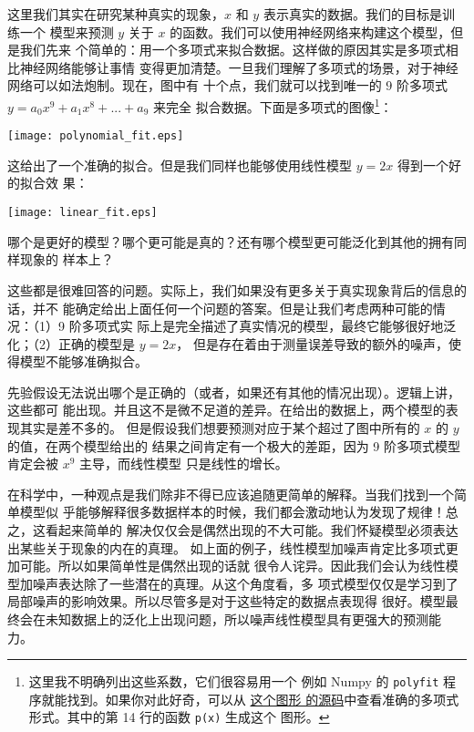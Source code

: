 这里我们其实在研究某种真实的现象，$x$ 和 $y$ 表示真实的数据。我们的目标是训练一个
模型来预测 $y$ 关于 $x$ 的函数。我们可以使用神经网络来构建这个模型，但是我们先来
个简单的：用一个多项式来拟合数据。这样做的原因其实是多项式相比神经网络能够让事情
变得更加清楚。一旦我们理解了多项式的场景，对于神经网络可以如法炮制。现在，图中有
十个点，我们就可以找到唯一的 $9$ 阶多项式 $y=a_0x^9 + a_1x^8 + ... + a_9$ 来完全
拟合数据。下面是多项式的图像\footnote{这里我不明确列出这些系数，它们很容易用一个
  例如 Numpy 的 \lstinline!polyfit! 程序就能找到。如果你对此好奇，可以从%
  \href{http://neuralnetworksanddeeplearning.com/js/polynomial_model.js}{这个图形
    的源码}中查看准确的多项式形式。其中的第 14 行的函数 \lstinline!p(x)! 生成这个
  图形。}：
\begin{center}
  \texttt{[image: polynomial\_fit.eps]}
\end{center}

这给出了一个准确的拟合。但是我们同样也能够使用线性模型 $y=2x$ 得到一个好的拟合效
果：
\begin{center}
  \texttt{[image: linear\_fit.eps]}
\end{center}

哪个是更好的模型？哪个更可能是真的？还有哪个模型更可能泛化到其他的拥有同样现象的
样本上？

这些都是很难回答的问题。实际上，我们如果没有更多关于真实现象背后的信息的话，并不
能确定给出上面任何一个问题的答案。但是让我们考虑两种可能的情况：（1）9 阶多项式实
际上是完全描述了真实情况的模型，最终它能够很好地泛化；（2）正确的模型是 $y=2x$，
但是存在着由于测量误差导致的额外的噪声，使得模型不能够准确拟合。

先验假设无法说出哪个是正确的（或者，如果还有其他的情况出现）。逻辑上讲，这些都可
能出现。并且这不是微不足道的差异。在给出的数据上，两个模型的表现其实是差不多的。
但是假设我们想要预测对应于某个超过了图中所有的 $x$ 的 $y$ 的值，在两个模型给出的
结果之间肯定有一个极大的差距，因为 9 阶多项式模型肯定会被 $x^9$ 主导，而线性模型
只是线性的增长。

在科学中，一种观点是我们除非不得已应该追随更简单的解释。当我们找到一个简单模型似
乎能够解释很多数据样本的时候，我们都会激动地认为发现了规律！总之，这看起来简单的
解决仅仅会是偶然出现的不大可能。我们怀疑模型必须表达出某些关于现象的内在的真理。
如上面的例子，线性模型加噪声肯定比多项式更加可能。所以如果简单性是偶然出现的话就
很令人诧异。因此我们会认为线性模型加噪声表达除了一些潜在的真理。从这个角度看，多
项式模型仅仅是学习到了局部噪声的影响效果。所以尽管多是对于这些特定的数据点表现得
很好。模型最终会在未知数据上的泛化上出现问题，所以噪声线性模型具有更强大的预测能
力。

